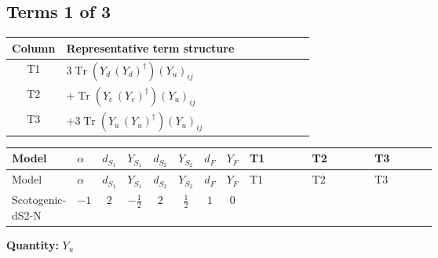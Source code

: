 \documentclass[8pt]{article}
\begin{document}
\begin{landscape}
\subsection*{Terms 1 of 3}
\begin{center}
\begin{tabular}{@{}c >{\raggedright\arraybackslash}p{0.82\linewidth}@{}}
\toprule
Column & Representative term structure \\
\midrule
T1 & \(\displaystyle 3 \operatorname{Tr}\!\left({Y_d}\,\left({Y_d}\right)^{\dagger}\right) \left({Y_u}\right)_{ij}\) \\
\midrule
T2 & \(\displaystyle +\operatorname{Tr}\!\left({Y_e}\,\left({Y_e}\right)^{\dagger}\right) \left({Y_u}\right)_{ij}\) \\
\midrule
T3 & \(\displaystyle +3 \operatorname{Tr}\!\left({Y_u}\,\left({Y_u}\right)^{\dagger}\right) \left({Y_u}\right)_{ij}\) \\
\midrule
\bottomrule
\end{tabular}
\end{center}
\smallskip
\tiny
\begin{longtable}{@{}llcccccc >{\raggedright\arraybackslash}p{0.21\linewidth} >{\raggedright\arraybackslash}p{0.21\linewidth} >{\raggedright\arraybackslash}p{0.21\linewidth}@{}}
\toprule
Model & $\alpha$ & $d_{S_1}$ & $Y_{S_1}$ & $d_{S_2}$ & $Y_{S_2}$ & $d_F$ & $Y_F$ & T1 & T2 & T3 \\
\midrule
\endfirsthead
\toprule
Model & $\alpha$ & $d_{S_1}$ & $Y_{S_1}$ & $d_{S_2}$ & $Y_{S_2}$ & $d_F$ & $Y_F$ & T1 & T2 & T3 \\
\midrule
\endhead
Scotogenic-dS2-N & $-1$ & $2$ & $-\frac{1}{2}$ & $2$ & $\frac{1}{2}$ & $1$ & $0$ & \scriptsize\adjustbox{max width=\linewidth}{$\begin{gathered} 3 \operatorname{Tr}\!\left({Y_d}\,\left({Y_d}\right)^{\dagger}\right) \left({Y_u}\right)_{ij}\end{gathered}$} & \scriptsize\adjustbox{max width=\linewidth}{$\begin{gathered} +\operatorname{Tr}\!\left({Y_e}\,\left({Y_e}\right)^{\dagger}\right) \left({Y_u}\right)_{ij}\end{gathered}$} & \scriptsize\adjustbox{max width=\linewidth}{$\begin{gathered} +3 \operatorname{Tr}\!\left({Y_u}\,\left({Y_u}\right)^{\dagger}\right) \left({Y_u}\right)_{ij}\end{gathered}$} \\
\midrule
\bottomrule
\end{longtable}
\clearpage
\noindent\textbf{Quantity: }$Y_u$\par\smallskip

\end{landscape}
\end{document}
